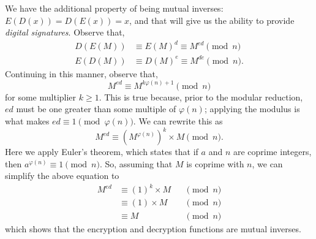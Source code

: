 We have the additional property of being mutual inverses:
$E(D(x)) = D(E(x)) = x$,
and that will give us the ability to provide \emph{digital signatures}.
Observe that,
\begin{align*}
        D(E(M)) &\equiv E(M)^d \equiv M^{e d} \pmod{n} \\
        E(D(M)) &\equiv D(M)^e \equiv M^{d e} \pmod{n}.
\end{align*}
Continuing in this manner, observe that,
\[
  M^{e d} \equiv M^{k \varphi(n) + 1} \pmod{n}
\]
for some multiplier $k \ge 1$. This is true because, prior to the
modular reduction, $ed$ must be one greater than some multiple of
$\varphi(n)$; applying the modulus is what makes
$e d \equiv 1 \pmod{\varphi(n)}$. We can rewrite this as
\[
  M^{e d} \equiv (M^{\varphi(n)})^k \times M \pmod{n}.
\]
Here we apply Euler's theorem, which states that if $a$ and $n$ are
coprime integers, then $a^{\varphi(n)} \equiv 1 \pmod{n}$. So, assuming
that $M$ is coprime with $n$, we can simplify the above equation to
\begin{align*}
  M^{e d} &\equiv (1)^k \times M  &&\pmod{n} \\
          &\equiv (1) \times M  &&\pmod{n} \\
          &\equiv M  &&\pmod{n}
\end{align*}
which shows that the encryption and decryption functions are
mutual inverses.
